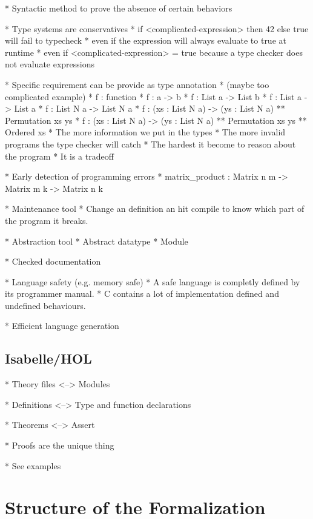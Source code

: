 \documentclass[a4paper, oneside, 12pt, titlepage]{article}
\begin{document}
  * Syntactic method to prove the absence of certain behaviors

  * Type systems are conservatives
    * if <complicated-expression> then 42 else true will fail to typecheck
      * even if the expression will always evaluate to true at runtime
      * even if <complicated-expression> = true because a type checker does not evaluate expressions

  * Specific requirement can be provide as type annotation
    * (maybe too complicated example)
    * f : function
    * f : a -> b
    * f : List a -> List b
    * f : List a -> List a
    * f : List N a -> List N a
    * f : (xs : List N a) -> (ys : List N a) ** Permutation xs ys
    * f : (xs : List N a) -> (ys : List N a) ** Permutation xs ys ** Ordered xs
    * The more information we put in the types
      * The more invalid programs the type checker will catch
      * The hardest it become to reason about the program
      * It is a tradeoff

  * Early detection of programming errors
    * matrix\_product : Matrix n m -> Matrix m k -> Matrix n k

  * Maintenance tool
    * Change an definition an hit compile to know which part of the program it breaks.

  * Abstraction tool
    * Abstract datatype
    * Module

  * Checked documentation

  * Language safety (e.g. memory safe)
    * A safe language is completly defined by its programmer manual.
      * C contains a lot of implementation defined and undefined behaviours.

  * Efficient language generation

\subsection{Isabelle/HOL}

  * Theory files <--> Modules

  * Definitions <--> Type and function declarations

  * Theorems <--> Assert

  * Proofs are the unique thing

  * See examples

\section{Structure of the Formalization}
\label{sec:structure-of-formalization}
\end{document}
